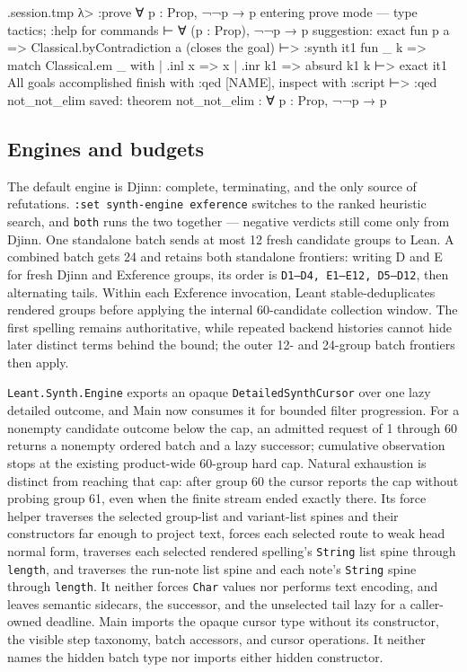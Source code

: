 \documentclass[11pt,oneside]{article}
\newcommand{\code}[1]{\texttt{#1}}
\newenvironment{session}
 {\VerbatimEnvironment\begin{VerbatimOut}{\jobname.session.tmp}}
 {\end{VerbatimOut}%
  \begin{sessionouter}%
  \VerbatimInput[fontsize=\footnotesize, breaklines=true,
    breaksymbolleft={\textcolor{stone}{\footnotesize$\hookrightarrow$}},
    formatcom=\color{ink}, tabsize=4]{\jobname.session.tmp}%
  \end{sessionouter}}
\begin{document}
\begin{session}
λ> :prove ∀ p : Prop, ¬¬p → p
entering prove mode — type tactics; :help for commands
⊢ ∀ (p : Prop), ¬¬p → p
suggestion: exact fun p a => Classical.byContradiction a  (closes the goal)
⊢> :synth
  it1  fun _ k => match Classical.em _ with | .inl x => x | .inr k1 => absurd k1 k
⊢> exact it1
All goals accomplished
finish with :qed [NAME], inspect with :script
⊢> :qed not_not_elim
saved: theorem not_not_elim : ∀ p : Prop, ¬¬p → p
\end{session}

\subsection{Engines and budgets}\label{sec:engines}

The default engine is Djinn: complete, terminating, and the only
source of refutations. \code{:set synth-engine exference} switches to
the ranked heuristic search, and \code{both} runs the two together ---
negative verdicts still come only from Djinn. One standalone batch sends at
most 12 fresh candidate groups to Lean. A combined batch gets 24 and
retains both standalone frontiers: writing D and E for fresh Djinn and
Exference groups, its order is \code{D1–D4, E1–E12, D5–D12}, then
alternating tails. Within each Exference invocation, Leant
stable-deduplicates rendered groups before applying the internal 60-candidate
collection window. The first spelling remains authoritative, while repeated
backend histories cannot hide later distinct terms behind the bound; the
outer 12- and 24-group batch frontiers then apply.

\code{Leant.Synth.Engine} exports an opaque \code{DetailedSynthCursor} over one
lazy detailed outcome, and Main now consumes it for bounded filter
progression.
For a nonempty candidate outcome below the cap, an admitted request of 1
through 60 returns a nonempty ordered batch and a lazy successor; cumulative
observation stops at the existing product-wide 60-group hard cap. Natural
exhaustion is distinct from reaching that cap: after group 60 the
cursor reports the cap without probing group 61, even when the finite stream
ended exactly there. Its force helper traverses the selected group-list and
variant-list spines and their constructors far enough to project text, forces
each selected route to weak head normal form, traverses each selected rendered
spelling's \code{String} list spine through \code{length}, and traverses the
run-note list spine and each note's \code{String} spine through \code{length}.
It neither forces \code{Char} values nor performs text encoding, and leaves
semantic sidecars, the successor, and the unselected tail lazy for a caller-owned
deadline. Main imports the opaque cursor type without its constructor, the
visible step taxonomy, batch accessors, and cursor operations. It neither names
the hidden batch type nor imports either hidden constructor.
\end{document}
